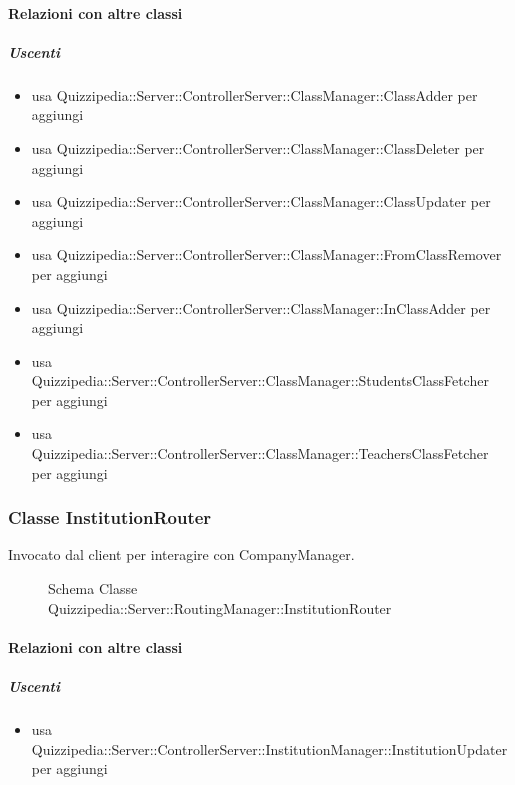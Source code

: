 \paragraph{Relazioni con altre classi}
\subparagraph{Uscenti}
\begin{itemize}
\item usa Quizzipedia::Server::ControllerServer::ClassManager::ClassAdder per aggiungi
\item usa Quizzipedia::Server::ControllerServer::ClassManager::ClassDeleter per aggiungi
\item usa Quizzipedia::Server::ControllerServer::ClassManager::ClassUpdater per aggiungi
\item usa Quizzipedia::Server::ControllerServer::ClassManager::FromClassRemover per aggiungi
\item usa Quizzipedia::Server::ControllerServer::ClassManager::InClassAdder per aggiungi
\item usa Quizzipedia::Server::ControllerServer::ClassManager::StudentsClassFetcher per aggiungi
\item usa Quizzipedia::Server::ControllerServer::ClassManager::TeachersClassFetcher per aggiungi
\end{itemize}
\subsubsection{Classe InstitutionRouter}
Invocato dal client per interagire con CompanyManager.
\begin{figure}[H]
\centering
\noindent{}
\caption[Schema Classe InstitutionRouter]{Schema Classe Quizzipedia::Server::RoutingManager::InstitutionRouter}
\end{figure}
\paragraph{Relazioni con altre classi}
\subparagraph{Uscenti}
\begin{itemize}
\item usa Quizzipedia::Server::ControllerServer::InstitutionManager::InstitutionUpdater per aggiungi
\end{itemize}
